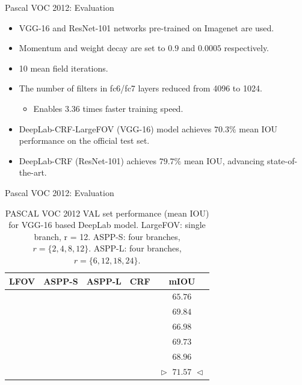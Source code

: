 \documentclass{beamer}
\newcommand\pro{\item[$+$]}
\begin{document}
\begin{frame}{Pascal VOC 2012: Evaluation}
\begin{itemize}
	\item<1-> VGG-16 and ResNet-101 networks pre-trained on Imagenet are used.
	\item<2-> {\color{blue}Momentum} and {\color{blue}weight decay} are set to $0.9$ and $0.0005$ respectively.
	\item<3-> 10 mean field iterations.
	\item<4-> The number of filters in fc6/fc7 layers reduced from 4096 to 1024.

\begin{itemize}
	\pro Enables 3.36 times faster training speed.
\end{itemize}
	\item<5-> DeepLab-CRF-LargeFOV (VGG-16) model achieves $70.3\%$ mean IOU performance on the official {\color{blue}test set}.
	\item<6-> DeepLab-CRF (ResNet-101) achieves $79.7\%$ mean IOU, advancing state-of-the-art.
\end{itemize}
\end{frame}

\begin{frame}{Pascal VOC 2012: Evaluation}
\begin{table}
	\begin{tabular}{ c c c c | c }
		\hline{}
		\rule{0pt}{2.5ex}    
		LFOV & ASPP-S  & ASPP-L & CRF & \textbf{mIOU} \\
		\hline
		\checkmark && & & $65.76$ \\
		\checkmark &&& \checkmark & $69.84$\\
		& \checkmark && & $66.98$  \\		
		&\checkmark & & \checkmark & $69.73$ \\
		&& \checkmark && $68.96$ \\
		&& {\color{green}\checkmark} & {\color{green}\checkmark}& {\color{green}$\vartriangleright$} {\color{green}$71.57$} {\color{green}$\vartriangleleft$} \\				
		\hline
	\end{tabular}
   	\captionsetup{justification=centering}
	\caption{PASCAL VOC 2012 {\color{blue}VAL} set performance (mean IOU) for {\color{blue}VGG-16} based DeepLab model. {\color{blue}LargeFOV}: single branch, r = 12. {\color{blue}ASPP-S}: four branches, $r=\{2, 4, 8, 12\}$. {\color{blue}ASPP-L}: four branches, $r = \{6, 12, 18, 24\}$.}
\end{table}	
\end{frame}
\end{document}
